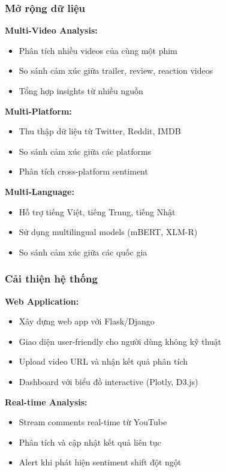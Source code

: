 \subsubsection{Mở rộng dữ liệu}

\textbf{Multi-Video Analysis:}
\begin{itemize}
    \item Phân tích nhiều videos của cùng một phim
    \item So sánh cảm xúc giữa trailer, review, reaction videos
    \item Tổng hợp insights từ nhiều nguồn
\end{itemize}

\textbf{Multi-Platform:}
\begin{itemize}
    \item Thu thập dữ liệu từ Twitter, Reddit, IMDB
    \item So sánh cảm xúc giữa các platforms
    \item Phân tích cross-platform sentiment
\end{itemize}

\textbf{Multi-Language:}
\begin{itemize}
    \item Hỗ trợ tiếng Việt, tiếng Trung, tiếng Nhật
    \item Sử dụng multilingual models (mBERT, XLM-R)
    \item So sánh cảm xúc giữa các quốc gia
\end{itemize}

\subsubsection{Cải thiện hệ thống}

\textbf{Web Application:}
\begin{itemize}
    \item Xây dựng web app với Flask/Django
    \item Giao diện user-friendly cho người dùng không kỹ thuật
    \item Upload video URL và nhận kết quả phân tích
    \item Dashboard với biểu đồ interactive (Plotly, D3.js)
\end{itemize}

\textbf{Real-time Analysis:}
\begin{itemize}
    \item Stream comments real-time từ YouTube
    \item Phân tích và cập nhật kết quả liên tục
    \item Alert khi phát hiện sentiment shift đột ngột
\end{itemize}

